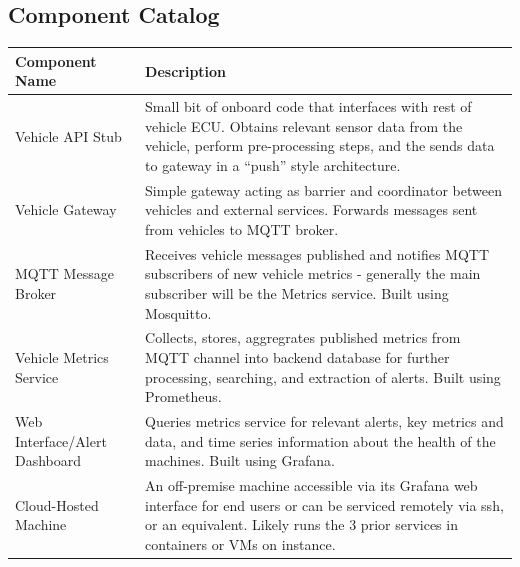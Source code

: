 \subsection{Component Catalog}
\begin{table}[H]
\begin{tabular}{|l|p{}|}
\hline
Component Name                & Description \\ \hline \hline
Vehicle API Stub              & Small bit of onboard code that interfaces with rest of vehicle ECU. Obtains relevant sensor data from the vehicle, perform pre-processing steps, and the sends data to gateway in a ``push'' style architecture. \\ \hline
Vehicle Gateway               & Simple gateway acting as barrier and coordinator between vehicles and external services. Forwards messages sent from vehicles to MQTT broker. \\ \hline
MQTT Message Broker           & Receives vehicle messages published and notifies MQTT subscribers of new vehicle metrics - generally the main subscriber will be the Metrics service. Built using Mosquitto. \\ \hline
Vehicle Metrics Service       & Collects, stores, aggregrates published metrics from MQTT channel into backend database for further processing, searching, and extraction of alerts. Built using Prometheus. \\ \hline
Web Interface/Alert Dashboard & Queries metrics service for relevant alerts, key metrics and data, and time series information about the health of the machines. Built using Grafana.\\ \hline
Cloud-Hosted Machine          & An off-premise machine accessible via its Grafana web interface for end users or can be serviced remotely via ssh, or an equivalent. Likely runs the 3 prior services in containers or VMs on instance. \\ \hline   
\end{tabular}
\end{table}



